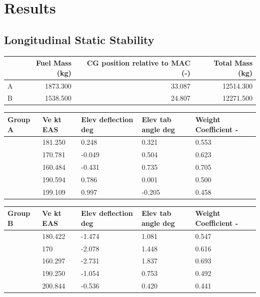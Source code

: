 \documentclass{article}
\begin{document}
\title{}
\author{lwp26}
\date{January 2025}
\maketitle

\section{Results}

\subsection{Longitudinal Static Stability}

\begin{table}[H]
    \centering
    \begin{tabular}{lrrr}
        \toprule
         & Fuel Mass (kg) & CG position relative to MAC (-) & Total Mass (kg) \\
        \midrule
        A & 1873.300 & 33.087 & 12514.300 \\
        B & 1538.500 & 24.807 & 12271.500 \\
        \bottomrule
        \end{tabular}
\end{table}

\begin{table}[H]
    \centering
    \begin{tabular}{lllll}
        \toprule
         Group A & Ve kt EAS & Elev deflection deg & Elev tab angle deg & Weight Coefficient - \\
        \midrule
        & 181.250 & 0.248 & 0.321 & 0.553 \\
        & 170.781 & -0.049 & 0.504 & 0.623 \\
        & 160.484 & -0.431 & 0.735 & 0.705 \\
        & 190.594 & 0.786 & 0.001 & 0.500 \\
        & 199.109 & 0.997 & -0.205 & 0.458 \\
        \bottomrule
        \end{tabular}
    \end{table}
\begin{table}[H]
    \centering        
    \begin{tabular}{lllll}
        \toprule
         Group B & Ve kt EAS & Elev deflection deg & Elev tab angle deg & Weight Coefficient - \\
        \midrule
         & 180.422 & -1.474 & 1.081 & 0.547 \\
         & 170 & -2.078 & 1.448 & 0.616 \\
         & 160.297 & -2.731 & 1.837 & 0.693 \\
         & 190.250 & -1.054 & 0.753 & 0.492 \\
         & 200.844 & -0.536 & 0.420 & 0.441 \\
        \bottomrule
        \end{tabular}
\end{table}
\end{document}
